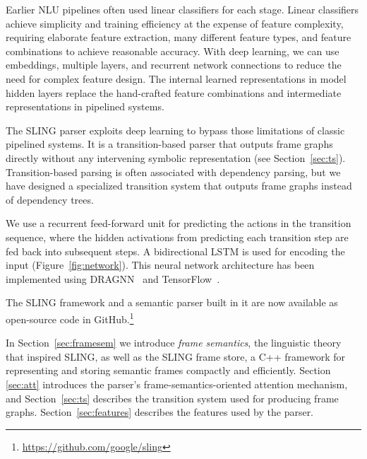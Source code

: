 \documentclass[11pt,a4paper]{article}
\begin{document}
Earlier NLU pipelines often used linear classifiers for each stage.
Linear classifiers achieve simplicity and training efficiency at the expense of
feature complexity, requiring elaborate feature
extraction, many different feature types, and
feature combinations to achieve reasonable accuracy.
With deep learning, we can use embeddings, multiple layers, and recurrent
network connections to reduce the need for complex
feature design. The internal learned representations in model hidden layers
replace the hand-crafted feature combinations and intermediate representations
in pipelined systems.


The SLING parser exploits deep learning to bypass those limitations of classic pipelined systems.
It is a transition-based parser that outputs frame graphs directly without any
intervening symbolic representation (see Section~\ref{sec:ts}). Transition-based
parsing is often associated with dependency parsing, but we have designed a
specialized transition system that outputs frame graphs instead of dependency
trees.

We use a recurrent feed-forward unit for predicting the actions in the
transition sequence, where the hidden activations from predicting each
transition step are fed back into subsequent steps.
A bidirectional LSTM is used for encoding the input (Figure~\ref{fig:network}).
This neural network architecture has been implemented using DRAGNN~\cite{dragnn}
and TensorFlow~\cite{tensorflow}.

The SLING framework and a semantic parser built in it are now available as open-source code in GitHub.\footnote{\url{https://github.com/google/sling}}

In Section~\ref{sec:framesem} we introduce \emph{frame semantics}, the linguistic theory that
inspired SLING, as well as the SLING frame store, a
C++ framework for representing and storing semantic frames compactly and
efficiently.
Section \ref{sec:att} introduces the parser's frame-semantics-oriented attention mechanism, and
Section~\ref{sec:ts} describes the transition system used for producing
frame graphs. Section~\ref{sec:features} describes the features used by the
parser.

\begin{figure*}[t]
  \centering
  
  \caption{Neural network architecture of the SLING parser. The input is encoded by
  a bi-directional LSTM and fed into a recurrent
  feed-forward (FF) unit that proposes transition system actions.
  The hidden layer activations and the transition system state are combined to create
  the input feature vector for the next step. The FF unit is
  run repeatedly until the transition system has reached a final state.}
  \label{fig:network}
\end{figure*}
\end{document}
